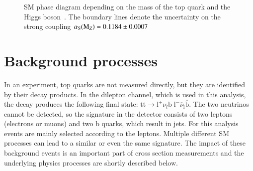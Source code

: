 \begin{figure}[htbp!]
  \begin{center}
\caption{SM phase diagram depending on the mass of the top quark and the Higgs boson~\cite{Buttazzo:2013uya}. The boundary lines denote the uncertainty on the strong coupling $\alpha_\mathrm{S}(\mathrm{M}_Z)=0.1184\pm0.0007$
  \label{fig:theo_stability}}
  \end{center}
\end{figure}

\section{Background processes}
\label{sec:theo_back}

In an experiment, top quarks are not measured directly, but they are identified by their decay products. In the dilepton channel, which is used in this analysis, the \ttbar decay produces the following final state:
$\mathrm{tt} \rightarrow \mathrm{l}^+ \nu_l \mathrm{b} \; \mathrm{l}^- \overline{\nu}_\mathrm{l}\overline{\mathrm{b}}$.
The two neutrinos cannot be detected, so the signature in the detector consists of two leptons (electrons or muons) and two b quarks, which result in jets.
For this analysis events are mainly selected according to the leptons.
Multiple different SM processes can lead to a similar or even the same signature. The impact of these background events is an important part of \ttbar cross section measurements and the underlying physics processes are shortly described below.

